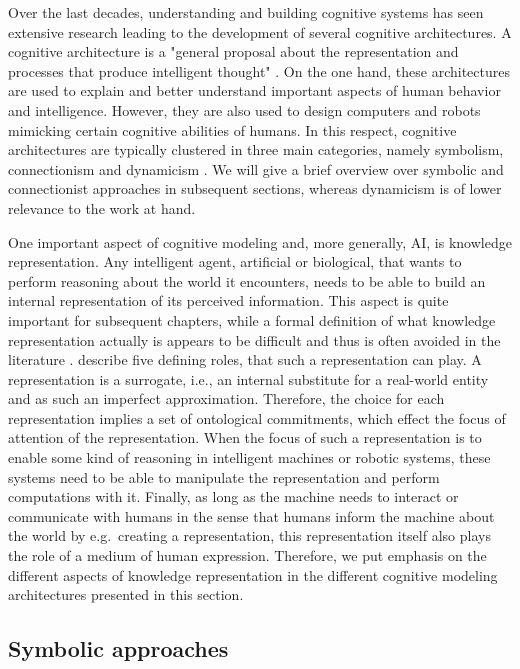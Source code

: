 Over the last decades, understanding and building cognitive systems has seen extensive research leading to the development of several cognitive architectures.
A cognitive architecture is a "general proposal about the representation and processes that produce intelligent thought" \parencite{Thagard2012}.
On the one hand, these architectures are used to explain and better understand important aspects of human behavior and intelligence.
However, they are also used to design computers and robots mimicking certain cognitive abilities of humans.
In this respect, cognitive architectures are typically clustered in three main categories, namely symbolism, connectionism and dynamicism \parencite{Eliasmith2013}.
We will give a brief overview over symbolic and connectionist approaches in subsequent sections, whereas dynamicism \parencite{Schoener2008} is of lower relevance to the work at hand.

One important aspect of cognitive modeling and, more generally, \ac{AI}, is knowledge representation.
Any intelligent agent, artificial or biological, that wants to perform reasoning about the world it encounters, needs to be able to build an internal representation of its perceived information.
This aspect is quite important for subsequent chapters, while a formal definition of what knowledge representation actually is appears to be difficult and thus is often avoided in the literature \parencite{Davis1993}.
\textcite{Davis1993} describe five defining roles, that such a representation can play.
A representation is a surrogate, i.e., an internal substitute for a real-world entity and as such an imperfect approximation.
Therefore, the choice for each representation implies a set of ontological commitments, which effect the focus of attention of the representation.  
When the focus of such a representation is to enable some kind of reasoning in intelligent machines or robotic systems, these systems need to be able to manipulate the representation and perform computations with it.
Finally, as long as the machine needs to interact or communicate with humans in the sense that humans inform the machine about the world by e.g.\ creating a representation, this representation itself also plays the role of a medium of human expression.
Therefore, we put emphasis on the different aspects of knowledge representation in the different cognitive modeling architectures presented in this section.

\subsection{Symbolic approaches}%
\label{subsec:symbolic_approaches}

